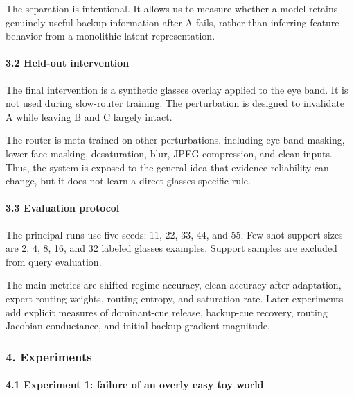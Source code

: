 \documentclass[
  10pt,
]{article}
\begin{document}
The separation is intentional. It allows us to measure whether a model
retains genuinely useful backup information after A fails, rather than
inferring feature behavior from a monolithic latent representation.

\hypertarget{held-out-intervention}{%
\paragraph{3.2 Held-out intervention}\label{held-out-intervention}}

The final intervention is a synthetic glasses overlay applied to the eye
band. It is not used during slow-router training. The perturbation is
designed to invalidate A while leaving B and C largely intact.

The router is meta-trained on other perturbations, including eye-band
masking, lower-face masking, desaturation, blur, JPEG compression, and
clean inputs. Thus, the system is exposed to the general idea that
evidence reliability can change, but it does not learn a direct
glasses-specific rule.

\hypertarget{evaluation-protocol}{%
\paragraph{3.3 Evaluation protocol}\label{evaluation-protocol}}

The principal runs use five seeds: 11, 22, 33, 44, and 55. Few-shot
support sizes are 2, 4, 8, 16, and 32 labeled glasses examples. Support
samples are excluded from query evaluation.

The main metrics are shifted-regime accuracy, clean accuracy after
adaptation, expert routing weights, routing entropy, and saturation
rate. Later experiments add explicit measures of dominant-cue release,
backup-cue recovery, routing Jacobian conductance, and initial
backup-gradient magnitude.

\hypertarget{experiments}{%
\subsubsection{4. Experiments}\label{experiments}}

\hypertarget{experiment-1-failure-of-an-overly-easy-toy-world}{%
\paragraph{4.1 Experiment 1: failure of an overly easy toy
world}\label{experiment-1-failure-of-an-overly-easy-toy-world}}
\end{document}
